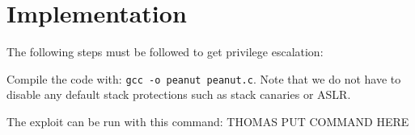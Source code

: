 \section{Implementation}
\label{sec:implementation}
The following steps must be followed to get privilege escalation:
\item Compile the code with:  {\tt gcc -o peanut peanut.c}. Note that we do not have to disable any default stack protections such as stack canaries or ASLR. 
\item The exploit can be run with this command: THOMAS PUT COMMAND HERE


